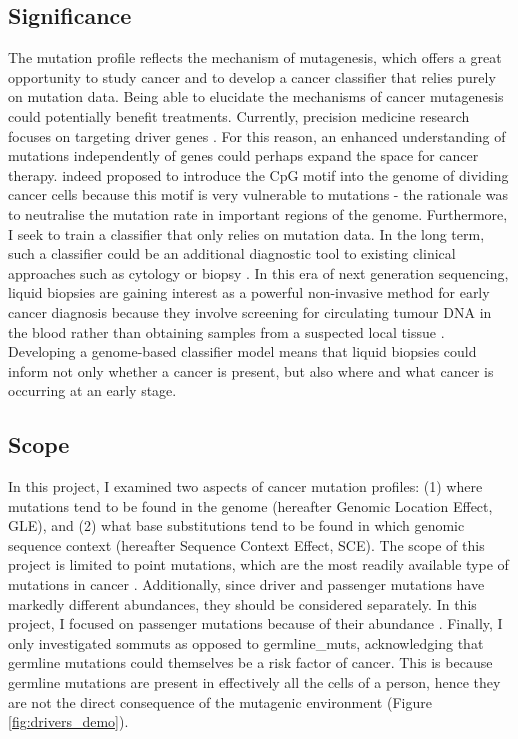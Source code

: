 

\subsection{Significance}\label{intro:significance}
The mutation profile reflects the mechanism of mutagenesis, which offers a great opportunity to study cancer and to develop a cancer classifier that relies purely on mutation data. Being able to elucidate the mechanisms of cancer mutagenesis could potentially benefit treatments. Currently, precision medicine research focuses on targeting driver genes \citep{Mukherjee2019Genomics-GuidedCancer}. For this reason, an enhanced understanding of mutations independently of genes could perhaps expand the space for cancer therapy. \citet{Chowdhury2018PresenceNucleotides} indeed proposed to introduce the CpG motif into the genome of dividing cancer cells because this motif is very vulnerable to mutations - the rationale was to neutralise the mutation rate in important regions of the genome. Furthermore, I seek to train a \gls{classifier} that only relies on mutation data. In the long term, such a classifier could be an additional diagnostic tool to existing clinical approaches such as cytology or biopsy \citep{Stone1995Biopsy:Pitfalls}. In this era of next generation sequencing, liquid biopsies are gaining interest as a powerful non-invasive method for early cancer diagnosis because they involve screening for circulating tumour DNA in the blood rather than obtaining samples from a suspected local tissue \citep{Chen2019Next-generationDetection}. Developing a genome-based classifier model means that liquid biopsies could inform not only whether a cancer is present, but also where and what cancer is occurring at an early stage.  

\subsection{Scope}
In this project, I examined two aspects of cancer mutation profiles: (1) where mutations tend to be found in the genome (hereafter Genomic Location Effect, GLE), and (2) what base substitutions tend to be found in which genomic sequence context (hereafter Sequence Context Effect, SCE). The scope of this project is limited to point mutations, which are the most readily available type of mutations in cancer \citep{Alexandrov2020}. Additionally, since driver and passenger mutations have markedly different abundances, they should be considered separately. In this project, I focused on passenger mutations because of their abundance \citep{McFarland2014Tug-of-warProcesses}. Finally, I only investigated \glspl{sommut} as opposed to \glspl{germline_mut}, acknowledging that germline mutations could themselves be a risk factor of cancer. This is because germline mutations are present in effectively all the cells of a person, hence they are not the direct consequence of the mutagenic environment (Figure \ref{fig:drivers_demo}).

